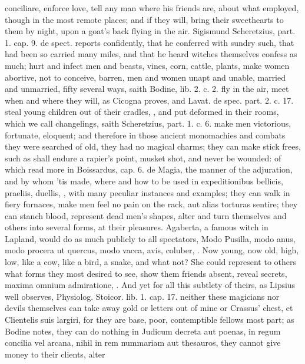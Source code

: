 {{conciliare, enforce love, tell any man where his friends are, about
what employed, though in the most remote places; and if they will,
bring their sweethearts to them by night, upon a goat's back
flying in the air. Sigismund Scheretzius, part. 1. cap. 9. de spect.
reports confidently, that he conferred with sundry such, that had been
so carried many miles, and that he heard witches themselves confess as
much; hurt and infect men and beasts, vines, corn, cattle, plants, make
women abortive, not to conceive, barren, men and women unapt and
unable, married and unmarried, fifty several ways, saith Bodine, lib.
2. c. 2. fly in the air, meet when and where they will, as Cicogna
proves, and Lavat. \textlatin{de spec}. part. 2. c. 17. steal young children out of
their cradles, , and put deformed in their rooms,
which we call changelings, saith Scheretzius, part. 1. c. 6. make
men victorious, fortunate, eloquent; and therefore in those ancient
monomachies and combats they were searched of old, they had no
magical charms; they can make stick frees, such as shall endure a
rapier's point, musket shot, and never be wounded: of which read more
in Boissardus, cap. 6. de Magia, the manner of the adjuration, and by
whom 'tis made, where and how to be used in expeditionibus bellicis,
praeliis, duellis, \etc{}, with many peculiar instances and examples; they
can walk in fiery furnaces, make men feel no pain on the rack, aut
alias torturas sentire; they can stanch blood, represent dead
men's shapes, alter and turn themselves and others into several forms,
at their pleasures. Agaberta, a famous witch in Lapland, would do
as much publicly to all spectators, Modo Pusilla, modo anus, modo
procera ut quercus, modo vacca, avis, coluber, \etc{}. Now young, now old,
high, low, like a cow, like a bird, a snake, and what not? She could
represent to others what forms they most desired to see, show them
friends absent, reveal secrets, maxima omnium admiratione, \etc{}. And yet
for all this subtlety of theirs, as Lipsius well observes, Physiolog.
Stoicor. lib. 1. cap. 17. neither these magicians nor devils themselves
can take away gold or letters out of mine or Crassus' chest, et
Clientelis suis largiri, for they are base, poor, contemptible fellows
most part; as Bodine notes, they can do nothing in Judicum
decreta aut poenas, in regum concilia vel arcana, nihil in rem
nummariam aut thesauros, they cannot give money to their clients, alter
}}
